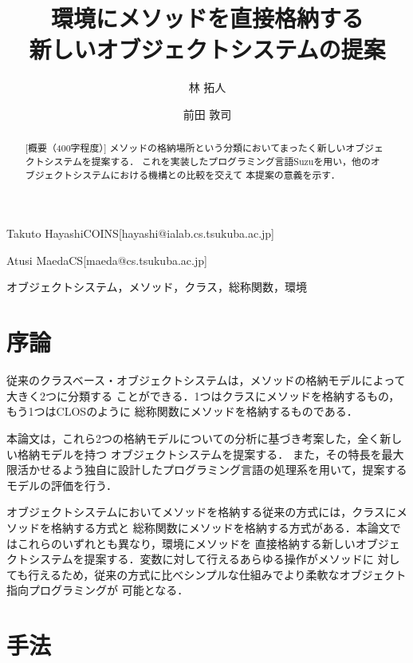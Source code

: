 \documentclass{ipsjprosym}
\begin{document}
\title{環境にメソッドを直接格納する \\ 新しいオブジェクトシステムの提案}


\author{林 拓人}{Takuto Hayashi}{COINS}[hayashi@ialab.cs.tsukuba.ac.jp]
\author{前田 敦司}{Atusi Maeda}{CS}[maeda@cs.tsukuba.ac.jp]

\begin{abstract}
[概要（400字程度）]
メソッドの格納場所という分類においてまったく新しいオブジェクトシステムを提案する．
これを実装したプログラミング言語Suzuを用い，他のオブジェクトシステムにおける機構との比較を交えて
本提案の意義を示す．
\end{abstract}

\begin{jkeyword}
オブジェクトシステム，メソッド，クラス，総称関数，環境
\end{jkeyword}

\maketitle

\section{序論}

従来のクラスベース・オブジェクトシステムは，メソッドの格納モデルによって大きく2つに分類する
ことができる．1つはクラスにメソッドを格納するもの，もう1つはCLOS\cite{CLOS}のように
総称関数にメソッドを格納するものである．

本論文は，これら2つの格納モデルについての分析に基づき考案した，全く新しい格納モデルを持つ
オブジェクトシステムを提案する．
また，その特長を最大限活かせるよう独自に設計したプログラミング言語の処理系を用いて，提案する
モデルの評価を行う．

オブジェクトシステムにおいてメソッドを格納する従来の方式には，クラスにメソッドを格納する方式と
総称関数にメソッドを格納する方式がある．本論文ではこれらのいずれとも異なり，環境にメソッドを
直接格納する新しいオブジェクトシステムを提案する．変数に対して行えるあらゆる操作がメソッドに
対しても行えるため，従来の方式に比べシンプルな仕組みでより柔軟なオブジェクト指向プログラミングが
可能となる．

\section{手法}
\end{document}
